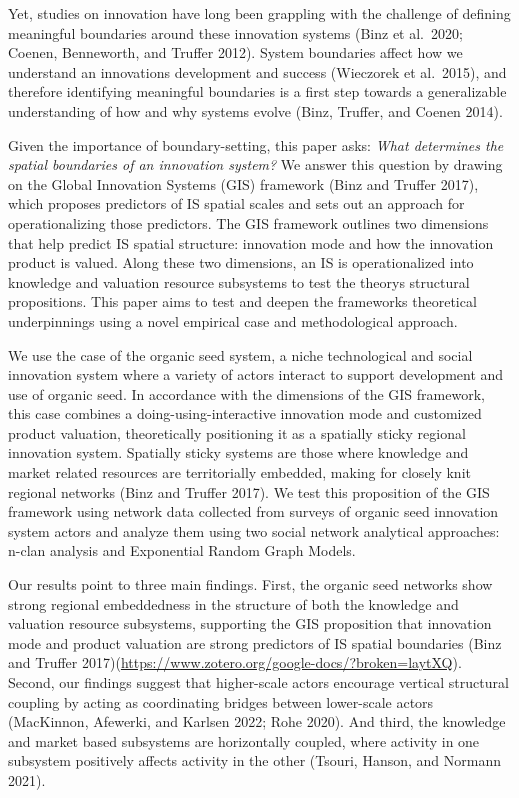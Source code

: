 \documentclass[twoside,12pt,final]{ucthesis-CA2012}
\begin{document}
\begin{ucmainmatter}
Yet, studies on innovation have long been grappling with the challenge
of defining meaningful boundaries around these innovation systems (Binz
et al.~2020; Coenen, Benneworth, and Truffer
2012). System boundaries
affect how we understand an innovation\textquotesingle s development and success
(Wieczorek et al.~2015),
and therefore identifying meaningful boundaries is a first step towards
a generalizable understanding of how and why systems evolve (Binz,
Truffer, and Coenen 2014).

Given the importance of boundary-setting, this paper asks: \emph{What
determines the spatial boundaries of an innovation system?} We answer
this question by drawing on the \textquotesingle Global Innovation Systems\textquotesingle{} (GIS)
framework (Binz and Truffer
2017), which proposes
predictors of IS spatial scales and sets out an approach for
operationalizing those predictors. The GIS framework outlines two
dimensions that help predict IS spatial structure: innovation \textquotesingle mode\textquotesingle{}
and how the innovation product is valued. Along these two dimensions, an
IS is operationalized into knowledge and valuation resource subsystems
to test the theory\textquotesingle s structural propositions. This paper aims to test
and deepen the framework\textquotesingle s theoretical underpinnings using a novel
empirical case and methodological approach.

We use the case of the organic seed system, a niche technological and
social innovation system where a variety of actors interact to support
development and use of organic seed. In accordance with the dimensions
of the GIS framework, this case combines a \textquotesingle doing-using-interactive\textquotesingle{}
innovation mode and customized product valuation, theoretically
positioning it as a \textquotesingle spatially sticky\textquotesingle{} regional innovation system.
Spatially sticky systems are those where knowledge and market related
resources are territorially embedded, making for closely knit regional
networks (Binz and Truffer
2017). We test this
proposition of the GIS framework using network data collected from
surveys of organic seed innovation system actors and analyze them using
two social network analytical approaches: n-clan analysis and
Exponential Random Graph Models.

Our results point to three main findings. First, the organic seed
networks show strong regional embeddedness in the structure of both the
knowledge and valuation resource subsystems, supporting the GIS
proposition that innovation mode and product valuation are strong
predictors of IS spatial boundaries (Binz and Truffer
2017)(\url{https://www.zotero.org/google-docs/?broken=laytXQ}). Second, our
findings suggest that higher-scale actors encourage vertical structural
coupling by acting as coordinating bridges between lower-scale actors
(MacKinnon, Afewerki, and Karlsen 2022; Rohe
2020). And third, the
knowledge and market based subsystems are horizontally coupled, where
activity in one subsystem positively affects activity in the other
(Tsouri, Hanson, and Normann
2021).


\end{ucmainmatter}
\end{document}
